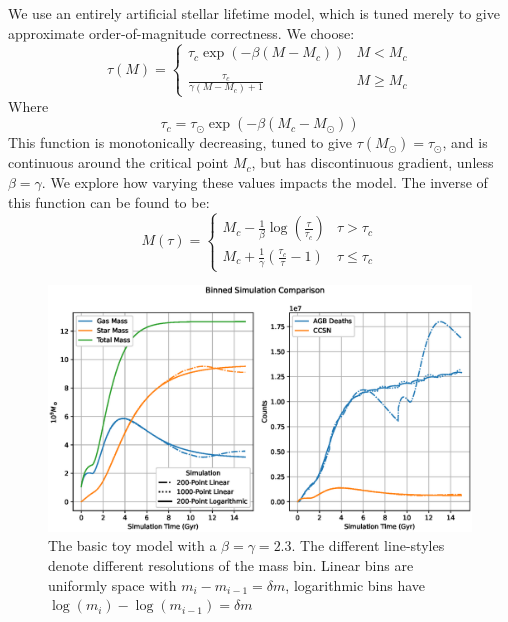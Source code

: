 \documentclass[a4paper,11pt]{article}
\begin{document}
			We use an entirely artificial stellar lifetime model, which is tuned merely to give approximate order-of-magnitude correctness. We choose:
			\begin{equation}
				\tau(M) = \begin{cases} \tau_c \exp\left(-\beta(M- M_c)\right) & M < M_c
					\\
					~
					\\
					\frac{\tau_c}{\gamma(M-M_c) + 1} & M\geq M_c
				\end{cases}
			\end{equation}
			Where
			\begin{equation}
				\tau_c = \tau_\odot \exp\left(-\beta(M_c- M_\odot)\right)
			\end{equation}
			This function is monotonically decreasing, tuned to give $\tau(M_\odot) = \tau_\odot$, and is continuous around the critical point $M_c$, but has discontinuous gradient, unless $\beta = \gamma$. We explore how varying these values impacts the model. The inverse of this function can be found to be:
			\begin{equation}
				M(\tau) = \begin{cases}
					M_c - \frac{1}{\beta} \log\left(\frac{\tau}{\tau_c}\right) & \tau > \tau_c
					\\
					M_c + \frac{1}{\gamma} \left(\frac{\tau_c}{\tau} - 1\right) & \tau \leq \tau_c
				\end{cases}
			\end{equation}

			\begin{figure}
				\begin{center}
				\includegraphics[width=\linewidth,height=0.4\paperheight,keepaspectratio=true]{BinnedSim_Pulsing.eps}
				\caption{The basic toy model with a $\beta = \gamma = 2.3$. The different line-styles denote different resolutions of the mass bin. Linear bins are uniformly space with $m_i - m_{i-1} = \delta m$, logarithmic bins have $\log(m_i) - \log(m_{i-1}) = \delta m$}\label{F:PulsingModel}
				\end{center}
			\end{figure}
\end{document}
